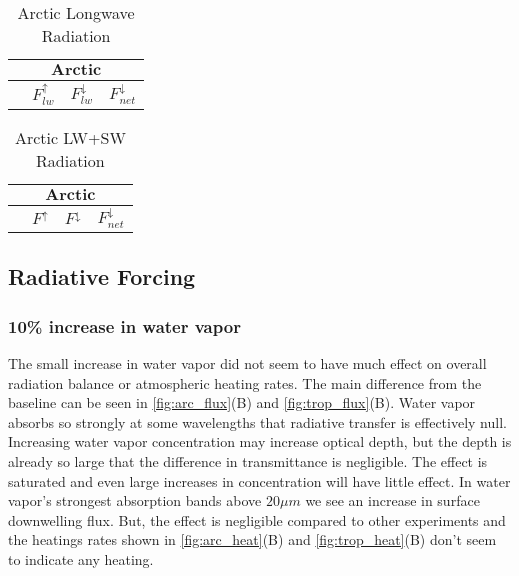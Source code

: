\documentclass[twocol]{ametsoc}
\begin{document}
\begin{table}[h]
    \centering
    \caption{Arctic Longwave Radiation}
    \label{tab:alr}
    \begin{tabular}{lccc}
        \toprule
        \multicolumn{4}{c}{$\textbf{Arctic}$}\\
        \midrule
        & $F^\uparrow_{lw}$ & $F^\downarrow_{lw}$ & $F^\downarrow_{net}$\\
        \midrule
        
        \bottomrule
    \end{tabular}

\end{table}

\begin{table}[h]
    \centering
    \caption{Arctic LW+SW Radiation}
    \label{tab:acr}
    \begin{tabular}{lccc}
        \toprule
        \multicolumn{4}{c}{$\textbf{Arctic}$}\\
        \midrule
        & $F^\uparrow$ & $F^\downarrow$ & $F^\downarrow_{net}$\\
        \midrule
        
        \bottomrule
    \end{tabular}

\end{table}

\subsection*{Radiative Forcing}
\subsubsection{10\% increase in water vapor}
The small increase in water vapor did not seem to have much effect on overall radiation balance or atmospheric heating rates.
The main difference from the baseline can be seen in \autoref{fig:arc_flux}(B) and \autoref{fig:trop_flux}(B).
Water vapor absorbs so strongly at some wavelengths that radiative transfer is effectively null. Increasing water vapor concentration may increase optical depth, but the depth is already so large that the difference in transmittance is negligible. The effect is saturated and even large increases in concentration will have little effect. In water vapor's strongest absorption bands above $20\mu m$ we see an increase in surface downwelling flux.
But, the effect is negligible compared to other experiments and the heatings rates shown in \autoref{fig:arc_heat}(B) and \autoref{fig:trop_heat}(B) don't seem to indicate any heating.
\end{document}
